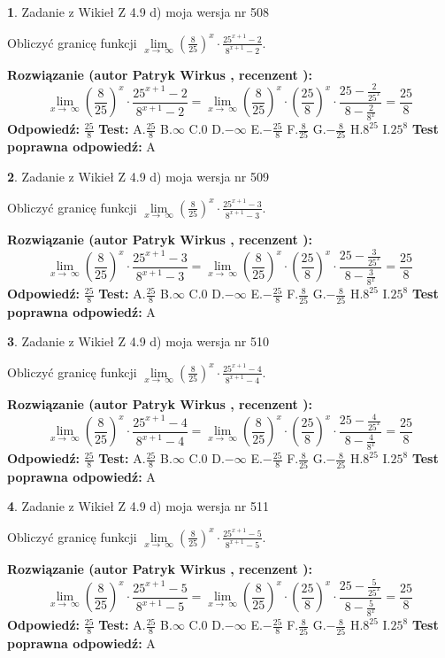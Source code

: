 \documentclass[12pt, a4paper]{article}
\theoremstyle{definition} %
\newtheorem{zad}{}
\newcommand{\zadStart}[1]{\begin{zad}#1\newline}
\newcommand{\zadStop}{\end{zad}}
\newcommand{\rozwStart}[2]{\noindent \textbf{Rozwiązanie (autor #1 , recenzent #2): }\newline}
\newcommand{\rozwStop}{\newline}
\newcommand{\odpStart}{\noindent \textbf{Odpowiedź:}\newline}
\newcommand{\odpStop}{\newline}
\newcommand{\testStart}{\noindent \textbf{Test:}\newline}
\newcommand{\testStop}{\newline}
\newcommand{\kluczStart}{\noindent \textbf{Test poprawna odpowiedź:}\newline}
\newcommand{\kluczStop}{\newline}
\begin{document}
\zadStart{Zadanie z Wikieł Z 4.9 d) moja wersja nr 508}


Obliczyć granicę funkcji  $\lim\limits_{x\to\ \infty}(\frac{8}{25})^{x}\cdot\frac{25^{x+1}-2}{8^{x+1}-2}$.
\zadStop
\rozwStart{Patryk Wirkus}{}
$$\lim\limits_{x\to\ \infty}(\frac{8}{25})^{x}\cdot\frac{25^{x+1}-2}{8^{x+1}-2}=\lim\limits_{x\to\ \infty}(\frac{8}{25})^{x}\cdot(\frac{25}{8})^{x} \cdot \frac{25-\frac{2}{25^{x}}}{8-\frac{2}{8^{x}}} = \frac{25}{8}$$
\rozwStop
\odpStart
$\frac{25}{8}$
\odpStop
\testStart
A.$\frac{25}{8}$ B.$\infty$ C.$0$ D.$-\infty$ E.$-\frac{25}{8}$
F.$\frac{8}{25}$ G.$-\frac{8}{25}$
H.$8^{25}$
I.$25^{8}$
\testStop
\kluczStart
A
\kluczStop



\zadStart{Zadanie z Wikieł Z 4.9 d) moja wersja nr 509}


Obliczyć granicę funkcji  $\lim\limits_{x\to\ \infty}(\frac{8}{25})^{x}\cdot\frac{25^{x+1}-3}{8^{x+1}-3}$.
\zadStop
\rozwStart{Patryk Wirkus}{}
$$\lim\limits_{x\to\ \infty}(\frac{8}{25})^{x}\cdot\frac{25^{x+1}-3}{8^{x+1}-3}=\lim\limits_{x\to\ \infty}(\frac{8}{25})^{x}\cdot(\frac{25}{8})^{x} \cdot \frac{25-\frac{3}{25^{x}}}{8-\frac{3}{8^{x}}} = \frac{25}{8}$$
\rozwStop
\odpStart
$\frac{25}{8}$
\odpStop
\testStart
A.$\frac{25}{8}$ B.$\infty$ C.$0$ D.$-\infty$ E.$-\frac{25}{8}$
F.$\frac{8}{25}$ G.$-\frac{8}{25}$
H.$8^{25}$
I.$25^{8}$
\testStop
\kluczStart
A
\kluczStop



\zadStart{Zadanie z Wikieł Z 4.9 d) moja wersja nr 510}


Obliczyć granicę funkcji  $\lim\limits_{x\to\ \infty}(\frac{8}{25})^{x}\cdot\frac{25^{x+1}-4}{8^{x+1}-4}$.
\zadStop
\rozwStart{Patryk Wirkus}{}
$$\lim\limits_{x\to\ \infty}(\frac{8}{25})^{x}\cdot\frac{25^{x+1}-4}{8^{x+1}-4}=\lim\limits_{x\to\ \infty}(\frac{8}{25})^{x}\cdot(\frac{25}{8})^{x} \cdot \frac{25-\frac{4}{25^{x}}}{8-\frac{4}{8^{x}}} = \frac{25}{8}$$
\rozwStop
\odpStart
$\frac{25}{8}$
\odpStop
\testStart
A.$\frac{25}{8}$ B.$\infty$ C.$0$ D.$-\infty$ E.$-\frac{25}{8}$
F.$\frac{8}{25}$ G.$-\frac{8}{25}$
H.$8^{25}$
I.$25^{8}$
\testStop
\kluczStart
A
\kluczStop



\zadStart{Zadanie z Wikieł Z 4.9 d) moja wersja nr 511}


Obliczyć granicę funkcji  $\lim\limits_{x\to\ \infty}(\frac{8}{25})^{x}\cdot\frac{25^{x+1}-5}{8^{x+1}-5}$.
\zadStop
\rozwStart{Patryk Wirkus}{}
$$\lim\limits_{x\to\ \infty}(\frac{8}{25})^{x}\cdot\frac{25^{x+1}-5}{8^{x+1}-5}=\lim\limits_{x\to\ \infty}(\frac{8}{25})^{x}\cdot(\frac{25}{8})^{x} \cdot \frac{25-\frac{5}{25^{x}}}{8-\frac{5}{8^{x}}} = \frac{25}{8}$$
\rozwStop
\odpStart
$\frac{25}{8}$
\odpStop
\testStart
A.$\frac{25}{8}$ B.$\infty$ C.$0$ D.$-\infty$ E.$-\frac{25}{8}$
F.$\frac{8}{25}$ G.$-\frac{8}{25}$
H.$8^{25}$
I.$25^{8}$
\testStop
\kluczStart
A
\kluczStop
\end{document}
